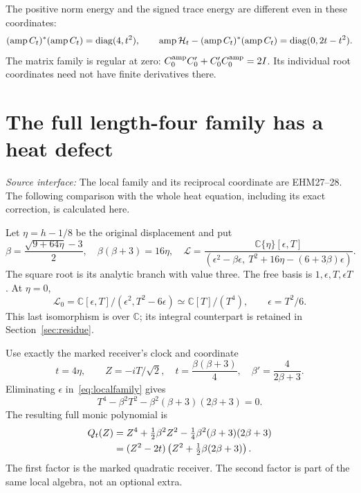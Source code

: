 \documentclass[11pt,a4paper]{article}
\theoremstyle{definition}\newtheorem{definition}[theorem]{Definition}\newtheorem{remark}[theorem]{Remark}
\newcommand{\C}{\mathbb C}\newcommand{\R}{\mathbb R}\newcommand{\Z}{\mathbb Z}\newcommand{\B}{\mathbb B}
\newcommand{\amp}{\operatorname{amp}}\newcommand{\supp}{\operatorname{supp}}\newcommand{\one}{1^\bullet}
\newcommand{\src}[1]{\textit{Source interface:} #1}
\begin{document}
The positive norm energy and the signed trace energy are different even in these coordinates:
\begin{equation}
 (\amp C_t)^*(\amp C_t)=\diag(4,t^2),\qquad
 \amp\mathcal H_t-(\amp C_t)^*(\amp C_t)=\diag(0,2t-t^2).
                                                        \label{eq:energydefect}
\end{equation}
The matrix family is regular at zero: $C_0^{\rm amp}C'_0+C'_0C_0^{\rm amp}=2I$. Its individual root coordinates need not have finite derivatives there.

\section{The full length-four family has a heat defect}\label{sec:heatdefect}
\src{The local family and its reciprocal coordinate are EHM27--28. The following comparison with the whole heat equation, including its exact correction, is calculated here.}

Let $\eta=h-1/8$ be the original displacement and put
\begin{equation}
 \beta=\frac{\sqrt{9+64\eta}-3}{2},\quad\beta(\beta+3)=16\eta,
 \quad
 \mathscr L=\frac{\C\{\eta\}[\epsilon,T]}
 {(\epsilon^2-\beta\epsilon,\ T^2+16\eta-(6+3\beta)\epsilon)}.
                                                        \label{eq:localfamily}
\end{equation}
The square root is its analytic branch with value three. The free basis is $1,\epsilon,T,\epsilon T$. At $\eta=0$,
\begin{equation}
 \mathscr L_0=\C[\epsilon,T]/(\epsilon^2,T^2-6\epsilon)
 \simeq\C[T]/(T^4),\qquad \epsilon=T^2/6.                \label{eq:lengthfour}
\end{equation}
This last isomorphism is over $\C$; its integral counterpart is retained in Section~\ref{sec:residue}.

Use exactly the marked receiver's clock and coordinate
\begin{equation}
 t=4\eta,\qquad Z=-iT/\sqrt2,\quad
 t=\frac{\beta(\beta+3)}4,\quad\beta'=\frac4{2\beta+3}.
                                                        \label{eq:quarticclock}
\end{equation}
Eliminating $\epsilon$ in~\eqref{eq:localfamily} gives
\[
 T^4-\beta^2T^2-\beta^2(\beta+3)(2\beta+3)=0.
\]
The resulting full monic polynomial is
\begin{align}
 Q_t(Z)&=Z^4+\tfrac12\beta^2Z^2-\tfrac14\beta^2(\beta+3)(2\beta+3)\notag\\
       &=(Z^2-2t)\left(Z^2+\tfrac12\beta(2\beta+3)\right).
                                                        \label{eq:quartic}
\end{align}
The first factor is the marked quadratic receiver. The second factor is part of the same local algebra, not an optional extra.
\end{document}
